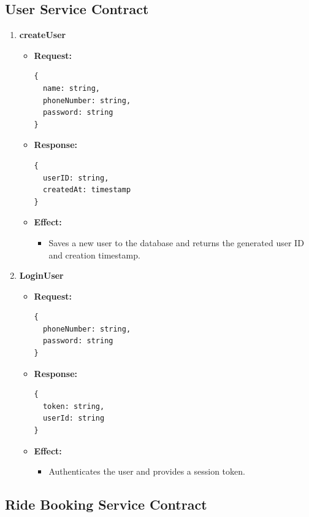 \documentclass[a4paper,12pt]{article}
\begin{document}
\subsection*{User Service Contract}

\begin{enumerate}
  \item \textbf{createUser}
    \begin{itemize}
      \item \textbf{Request:}
      \begin{verbatim}
{
  name: string, 
  phoneNumber: string, 
  password: string
}
      \end{verbatim}
      \item \textbf{Response:}
      \begin{verbatim}
{
  userID: string, 
  createdAt: timestamp
}
      \end{verbatim}
      \item \textbf{Effect:}
      \begin{itemize}
        \item Saves a new user to the database and returns the generated user ID and creation timestamp.
      \end{itemize}
    \end{itemize}

  \item \textbf{LoginUser}
    \begin{itemize}
      \item \textbf{Request:}
      \begin{verbatim}
{
  phoneNumber: string, 
  password: string
}
      \end{verbatim}
      \item \textbf{Response:}
      \begin{verbatim}
{
  token: string, 
  userId: string
}
      \end{verbatim}
      \item \textbf{Effect:}
      \begin{itemize}
        \item Authenticates the user and provides a session token.
      \end{itemize}
    \end{itemize}
\end{enumerate}

\subsection*{Ride Booking Service Contract}
\end{document}
